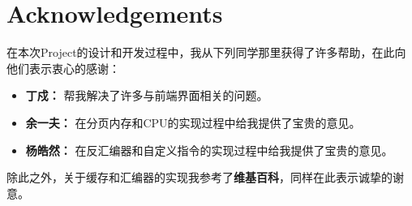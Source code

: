\section{Acknowledgements}

在本次Project的设计和开发过程中，我从下列同学那里获得了许多帮助，在此向他们表示衷心的感谢：

\vspace{20pt}

\begin{itemize}
\item {\bf 丁\hspace{12pt}戍：} 帮我解决了许多与前端界面相关的问题。
\item {\bf 余一夫：} 在分页内存和CPU的实现过程中给我提供了宝贵的意见。
\item {\bf 杨皓然：} 在反汇编器和自定义指令的实现过程中给我提供了宝贵的意见。
\end{itemize}

\vspace{20pt}

除此之外，关于缓存和汇编器的实现我参考了{\bf 维基百科}，同样在此表示诚挚的谢意。
